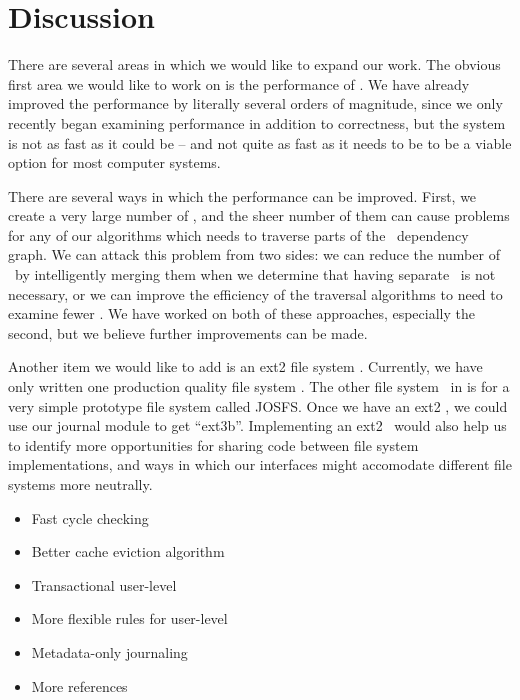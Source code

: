 \section {Discussion}
\label{sec:discussion}

There are several areas in which we would like to expand our work. The obvious
first area we would like to work on is the performance of \Kudos. We have
already improved the performance by literally several orders of magnitude, since
we only recently began examining performance in addition to correctness, but the
system is not as fast as it could be -- and not quite as fast as it needs to be
to be a viable option for most computer systems.

There are several ways in which the performance can be improved. First, we
create a very large number of \chdescs, and the sheer number of them can cause
problems for any of our algorithms which needs to traverse parts of the \chdesc\
dependency graph. We can attack this problem from two sides: we can reduce the
number of \chdescs\ by intelligently merging them when we determine that having
separate \chdescs\ is not necessary, or we can improve the efficiency of the
traversal algorithms to need to examine fewer \chdescs. We have worked on both
of these approaches, especially the second, but we believe further improvements
can be made.

Another item we would like to add is an ext2 file system \module. Currently,
we have only written one production quality file system \module. The other
file system \module\ in \Kudos is for a very simple prototype file system
called JOSFS. Once we have an ext2 \module, we could use our journal module to
get ``ext3b''. Implementing an ext2 \module\ would also help us to identify
more opportunities for sharing code between file system implementations, and
ways in which our interfaces might accomodate different file systems more
neutrally.

\begin{itemize}
\item Fast cycle checking
\item Better cache eviction algorithm
\item Transactional user-level \chdescs
\item More flexible rules for user-level \chdescs
\item Metadata-only journaling
\item More references
\end{itemize}
